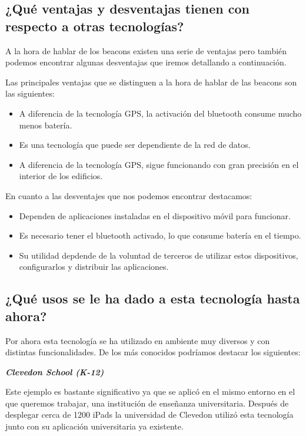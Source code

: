 \subsection{¿Qué ventajas y desventajas tienen con respecto a otras tecnologías?}

A la hora de hablar de los beacons existen una serie de ventajas pero también podemos encontrar algunas desventajas que iremos detallando a continuación. 


Las principales ventajas que se distinguen a la hora de hablar de las beacons son las siguientes: 

\begin{itemize}
\item A diferencia de la tecnología GPS, la activación del bluetooth consume mucho menos batería. 
\item Es una tecnología que puede ser dependiente de la red de datos. 
\item A diferencia de la tecnología GPS, sigue funcionando con gran precisión en el interior de los edificios.
\end{itemize}

En cuanto a las desventajes que nos podemos encontrar destacamos:

\begin{itemize}
\item Dependen de aplicaciones instaladas en el dispositivo móvil para funcionar. 
\item Es necesario tener el bluetooth activado, lo que consume batería en el tiempo. 
\item Su utilidad depdende de la voluntad de terceros de utilizar estos dispositivos, configurarlos y distribuir las aplicaciones.
\end{itemize}

\subsection{¿Qué usos se le ha dado a esta tecnología hasta ahora?}

Por ahora esta tecnología se ha utilizado en ambiente muy diversos y con distintas funcionalidades. De los más conocidos podríamos destacar los siguientes: 

\vspace{5mm}

\textsl{\textbf{{Clevedon School (K-12)}}}

\vspace{2mm}

Este ejemplo es bastante significativo ya que se aplicó en el mismo entorno en el que queremos trabajar, una institución de enseñanza universitaria. Después de desplegar cerca de 1200 iPads  la universidad de Clevedon utilizó esta tecnología junto con su aplicación universitaria ya existente. 

